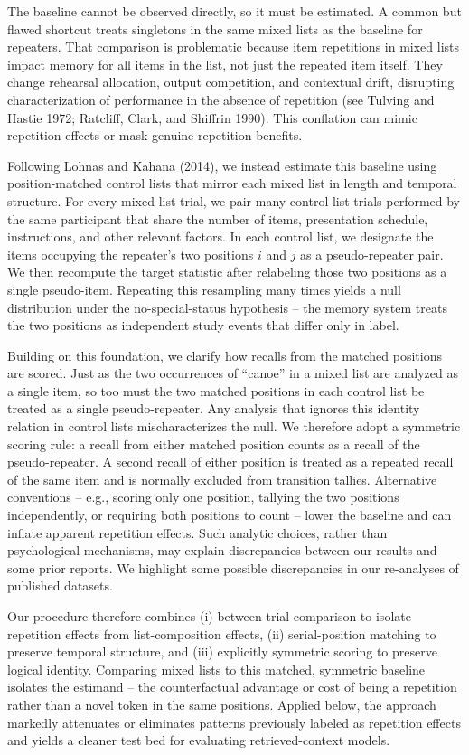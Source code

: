 \documentclass[
  letterpaper,
  11pt,
  english,
  singlespacing,
  headsepline]{MastersDoctoralThesis}
\begin{document}
The baseline cannot be observed directly, so it must be estimated. A
common but flawed shortcut treats singletons in the same mixed lists as
the baseline for repeaters. That comparison is problematic because item
repetitions in mixed lists impact memory for all items in the list, not
just the repeated item itself. They change rehearsal allocation, output
competition, and contextual drift, disrupting characterization of
performance in the absence of repetition (see Tulving and Hastie 1972;
Ratcliff, Clark, and Shiffrin 1990). This conflation can mimic
repetition effects or mask genuine repetition benefits.

Following Lohnas and Kahana (2014), we instead estimate this baseline
using position-matched control lists that mirror each mixed list in
length and temporal structure. For every mixed-list trial, we pair many
control-list trials performed by the same participant that share the
number of items, presentation schedule, instructions, and other relevant
factors. In each control list, we designate the items occupying the
repeater's two positions \(i\) and \(j\) as a pseudo-repeater pair. We
then recompute the target statistic after relabeling those two positions
as a single pseudo-item. Repeating this resampling many times yields a
null distribution under the no-special-status hypothesis -- the memory
system treats the two positions as independent study events that differ
only in label.

Building on this foundation, we clarify how recalls from the matched
positions are scored. Just as the two occurrences of ``canoe'' in a
mixed list are analyzed as a single item, so too must the two matched
positions in each control list be treated as a single pseudo-repeater.
Any analysis that ignores this identity relation in control lists
mischaracterizes the null. We therefore adopt a symmetric scoring rule:
a recall from either matched position counts as a recall of the
pseudo-repeater. A second recall of either position is treated as a
repeated recall of the same item and is normally excluded from
transition tallies. Alternative conventions -- e.g., scoring only one
position, tallying the two positions independently, or requiring both
positions to count -- lower the baseline and can inflate apparent
repetition effects. Such analytic choices, rather than psychological
mechanisms, may explain discrepancies between our results and some prior
reports. We highlight some possible discrepancies in our re-analyses of
published datasets.

Our procedure therefore combines (i) between-trial comparison to isolate
repetition effects from list-composition effects, (ii) serial-position
matching to preserve temporal structure, and (iii) explicitly symmetric
scoring to preserve logical identity. Comparing mixed lists to this
matched, symmetric baseline isolates the estimand -- the counterfactual
advantage or cost of being a repetition rather than a novel token in the
same positions. Applied below, the approach markedly attenuates or
eliminates patterns previously labeled as repetition effects and yields
a cleaner test bed for evaluating retrieved-context models.
\end{document}
